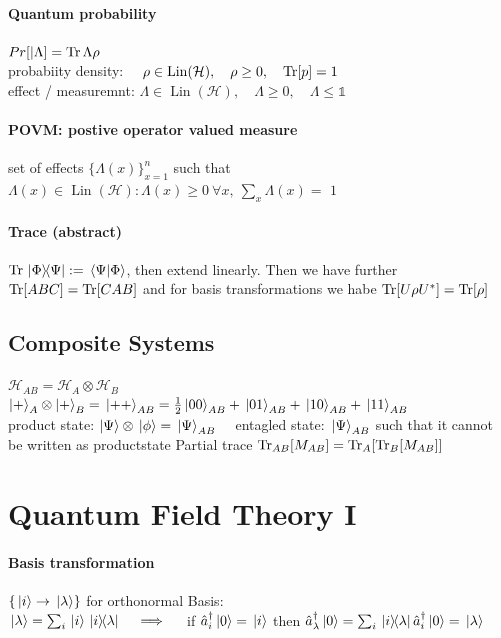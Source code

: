 \paragraph{Quantum probability}
$Pr[|\Lambda] = \Trace{\Lambda \rho} $\\
probabiity density: $\quad \rho \in \operatorname{Lin}(\mathcal{H}), \quad \rho \geq 0, \quad \Trace[p] =1$\\
effect / measuremnt: $\Lambda \in \operatorname{Lin}(\mathcal{H}), \quad \Lambda \geq 0, \quad \Lambda \leq \mathbb{1}$

\paragraph{POVM: postive operator valued measure} set of effects $\{ \Lambda (x)\}^n_{x=1}$ such that
$\Lambda(x) \in \operatorname{Lin}(\mathcal{H}) : \Lambda(x) \geq 0 \ \forall x, \ \sum_x \Lambda(x) =$ $1$

\paragraph{Trace (abstract)} $\Trace{\ketbra*{\Phi}{\Psi}} := \braket*{\Psi}{\Phi}$, then extend linearly. Then we have further\\
$\Trace[ABC]= \Trace[CAB]$ and for basis transformations we habe $\Tr[U \rho U^* ]= \Tr[\rho]$\\

\subsection{Composite Systems} 
$\mathcal{H}_{AB} = \mathcal{H}_A \otimes \mathcal{H}_B$\\
$\ket{+}_A\otimes \ket{+}_B = \ket*{++}_{AB} = \frac{1}{2} \ket*{00}_{AB}+ \ket*{01}_{AB}+ \ket*{10}_{AB}+\ket*{11}_{AB}$\\
product state: $\ket{\Psi}\otimes \ket*{\phi} = \ket*{\Psi}_{AB} \quad$ entagled state: $\ket*{\Psi}_{AB}$ such that it cannot be written as productstate
Partial trace $\Tr_{AB}[M_{AB}] = \Tr_A[\Tr_B[M_{AB}]]$


\section{Quantum Field Theory I}

\paragraph{Basis transformation} $\{ \ket*{i} \to \ket*{\lambda} \}$  for orthonormal Basis:\\ 
$\ket*{\lambda } = \sum_i \ket*{i} \ketbra*{i}{\lambda} \quad   \implies  \quad $ if $\hat{a}_i^\dagger \ket*{0} = \ket*{i}$ then 
$\hat{a}_\lambda^\dagger \ket*{0} = \sum_i \ketbra*{i}{\lambda} \hat{a}_i^\dagger \ket{0} = \ket*{\lambda} $\\

